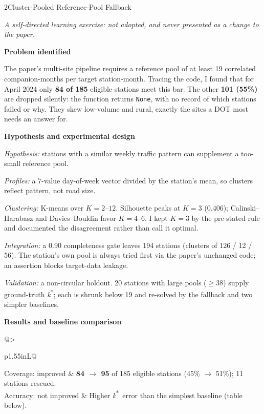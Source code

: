 \documentclass[10pt]{article}
\newcommand{\sectionhead}[1]{%
  \par\vspace{8pt}%
  {\headfont\fontsize{12.5}{15}\selectfont\color{navy}#1\par}%
  \vspace{2.5pt}{\color{rulegray}\hrule height 0.6pt}\vspace{4pt}}
\newcommand{\subhead}[1]{%
  \par\vspace{4.5pt}%
  {\labelfont\bfseries\fontsize{10}{12}\selectfont\color{navy}#1\par}\vspace{1.5pt}}
\newlength{\itemgap}\setlength{\itemgap}{1.5pt}
\newenvironment{points}{\begin{list}{\textcolor{navy}{\small\textbullet}}{%
  \setlength{\leftmargin}{1.05em}\setlength{\labelwidth}{0.7em}%
  \setlength{\labelsep}{0.4em}\setlength{\itemsep}{\itemgap}%
  \setlength{\parsep}{0pt}\setlength{\topsep}{1pt}\setlength{\partopsep}{0pt}}}%
  {\end{list}}
\newcommand{\kstar}{\textit{k}\textsuperscript{*}}
\newcommand{\lbl}[1]{{\leavevmode\labelfont\fontsize{9}{11}\selectfont\color{slate}#1}}
\newcommand{\num}[1]{\textbf{#1}}
\begin{document}
\sectionhead{2\quad Cluster-Pooled Reference-Pool Fallback}
{\itshape\color{slate}A self-directed learning exercise: not adopted, and never presented as a change to the paper.\par}
\vspace{1pt}

\subhead{Problem identified}
The paper's multi-site pipeline requires a reference pool of at least 19 correlated companion-months
per target station-month. Tracing the code, I found that for April 2024 only \num{84 of 185} eligible
stations meet this bar. The other \num{101 (55\%)} are dropped silently: the function returns
\texttt{None}, with no record of which stations failed or why. They skew low-volume and rural, exactly
the sites a DOT most needs an answer for.

\subhead{Hypothesis and experimental design}
\textit{Hypothesis:} stations with a similar weekly traffic pattern can supplement a too-small reference pool.
\begin{points}
  \item \textit{Profiles:} a 7-value day-of-week vector divided by the station's mean, so clusters
    reflect pattern, not road size.
  \item \textit{Clustering:} K-means over $K = 2$--$12$. Silhouette peaks at $K{=}3$ (0.406);
    Calinski--Harabasz and Davies--Bouldin favor $K{=}4$--$6$. I kept $K{=}3$ by the pre-stated rule and
    documented the disagreement rather than call it optimal.
  \item \textit{Integration:} a 0.90 completeness gate leaves 194 stations (clusters of 126 / 12 / 56).
    The station's own pool is always tried first via the paper's unchanged code; an assertion blocks
    target-data leakage.
  \item \textit{Validation:} a non-circular holdout. 20 stations with large pools ($\geq$38) supply
    ground-truth \kstar; each is shrunk below 19 and re-solved by the fallback and two simpler baselines.
\end{points}

\subhead{Results and baseline comparison}
{\renewcommand{\arraystretch}{1.12}%
\begin{tabularx}{\linewidth}{@{}>{\raggedright\arraybackslash}p{1.55in}L@{}}
\lbl{Coverage: improved} & \num{84 $\rightarrow$ 95} of 185 eligible stations (45\% $\rightarrow$
  51\%); 11 stations rescued.\\
\lbl{Accuracy: not improved} & Higher \kstar\ error than the simplest baseline (table below).\\
\end{tabularx}}
\end{document}
